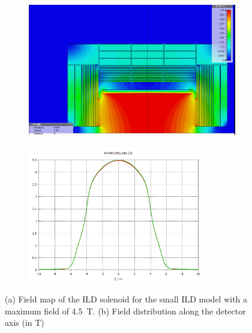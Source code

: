 \begin{figure}[t]
\begin{center}
\begin{subfigure}{0.75\hsize} \includegraphics[width=\textwidth]{Integration/fig/field_small_4_5.png}
\caption{ \label{ild:fig:magnet_small_map}}
 \end{subfigure}
\hspace{0.03\textwidth}
\begin{subfigure}{0.75\hsize} \includegraphics[width=\textwidth, height = 6cm]{Integration/fig/field_small_4_5_plot.png}
\caption{  \label{ild:fig:magnet_small_field}}
 \end{subfigure}
\end{center}
\caption{(a) Field map of the ILD solenoid for the small ILD model with a maximum field of 4.5~T. (b) Field distribution along the detector axis (in T)~\cite{ild:bib:Magnet_Simulations}}
\label{ILD:fig:magnet_small}
\end{figure}


